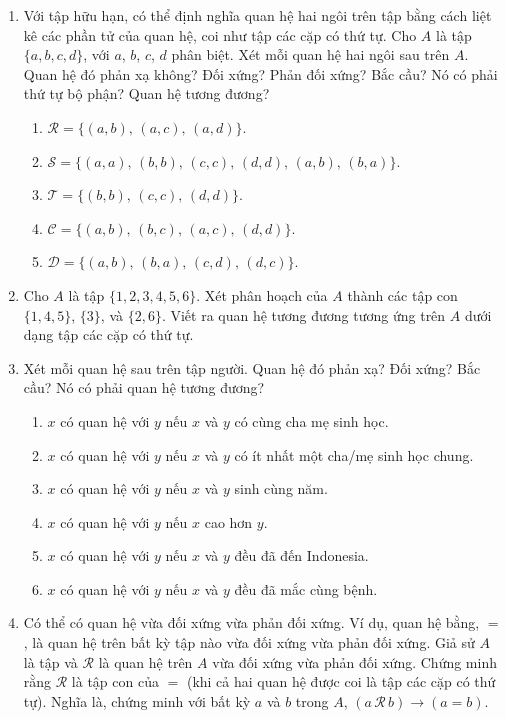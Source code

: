 \begin{enumerate}
\item[1.] Với tập hữu hạn, có thể định nghĩa quan hệ hai ngôi trên tập bằng cách liệt kê các phần tử của quan hệ, coi như tập các cặp có thứ tự. Cho $A$ là tập $\{a,b,c,d\}$, với $a$, $b$, $c$, $d$ phân biệt. Xét mỗi quan hệ hai ngôi sau trên $A$. Quan hệ đó phản xạ không? Đối xứng? Phản đối xứng? Bắc cầu? Nó có phải thứ tự bộ phận? Quan hệ tương đương?
\begin{enumerate}[label=\alph*)]
\item $\mathcal{R} = \{(a,b),\, (a,c),\, (a,d)\}$.
\item $\mathcal{S} = \{(a,a),\, (b,b),\, (c,c),\, (d,d),\, (a,b),\, (b,a)\}$.
\item $\mathcal{T} = \{(b,b),\, (c,c),\, (d,d)\}$.
\item $\mathcal{C} = \{(a,b),\, (b,c),\, (a,c),\, (d,d)\}$.
\item $\mathcal{D} = \{(a,b),\, (b,a),\, (c,d),\, (d,c)\}$.
\end{enumerate}

\item[2.] Cho $A$ là tập $\{1,2,3,4,5,6\}$. Xét phân hoạch của $A$ thành các tập con $\{1,4,5\}$, $\{3\}$, và $\{2,6\}$. Viết ra quan hệ tương đương tương ứng trên $A$ dưới dạng tập các cặp có thứ tự.

\item[3.] Xét mỗi quan hệ sau trên tập người. Quan hệ đó phản xạ? Đối xứng? Bắc cầu? Nó có phải quan hệ tương đương?
\begin{enumerate}[label=\alph*)]
\item $x$ có quan hệ với $y$ nếu $x$ và $y$ có cùng cha mẹ sinh học.
\item $x$ có quan hệ với $y$ nếu $x$ và $y$ có ít nhất một cha/mẹ sinh học chung.
\item $x$ có quan hệ với $y$ nếu $x$ và $y$ sinh cùng năm.
\item $x$ có quan hệ với $y$ nếu $x$ cao hơn $y$.
\item $x$ có quan hệ với $y$ nếu $x$ và $y$ đều đã đến Indonesia.
\item $x$ có quan hệ với $y$ nếu $x$ và $y$ đều đã mắc cùng bệnh.
\end{enumerate}

\item[4.] Có thể có quan hệ vừa đối xứng vừa phản đối xứng. Ví dụ, quan hệ bằng, $=$, là quan hệ trên bất kỳ tập nào vừa đối xứng vừa phản đối xứng. Giả sử $A$ là tập và $\mathcal{R}$ là quan hệ trên $A$ vừa đối xứng vừa phản đối xứng. Chứng minh rằng $\mathcal{R}$ là tập con của $=$ (khi cả hai quan hệ được coi là tập các cặp có thứ tự). Nghĩa là, chứng minh với bất kỳ $a$ và $b$ trong $A$, $(a\,\mathcal{R}\,b) \to (a = b)$.


\end{enumerate}
